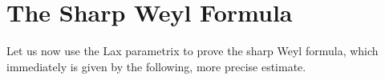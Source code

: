 \begin{comment}
    We have
    \[ \frac{\partial^N K_t(x,y)}{\partial t^N} = (2 \pi i)^N \int (\phi_1(x,y,\xi) - \phi_0(x,y,\xi))^N a(x,y,\xi) e^{2 \pi i \phi_t(x,y,\xi)}\; d\xi. \]
    Now $(\phi_1 - \phi_0)^N \cdot a$ is a symbol of order $r + N$. But on the other hand, using the fact that $(\phi_1 - \phi_0)^N \lesssim |x - y|^{2N} |\xi|^N$, and thus vanishes to order $2N$ on the diagonal, then combined with the fact that $|\nabla_\xi \phi(x,y,\xi)| \gtrsim |x - y|$, we actually see via an integration by parts $2N$ times in $\xi$ that we can rewrite the integral in terms of a symbol of order $r - N$ and the same phase $\phi_t$. Applying Taylor's theorem, we write
    \[ K(x,y) = K_1(x,y) = \sum_{k = 0}^{N-1} \frac{1}{k!} \left. \frac{\partial^k K_t(x,y)}{\partial t^k} \right|_{t = 1} + \frac{1}{N!} \int_0^1 t^{N-1} \frac{d^NK_t(x,y)}{dt^N}\; dt. \]
    This integral gives an arbitrarily smooth kernel as $N \to \infty$. Thus if we let $T$ be a pseudodifferential operator of order $r$ such that
    \[ T \sim \sum_{k = 0}^\infty \frac{1}{k!} \left. \frac{\partial^k K_t(x,y)}{\partial t^k} \right|_{t = 1}, \]
    then $T - S$ is a smoothing operator. Now if $\tilde{T}$ is the pseudodifferential operator corresponding to the symbol $a(x,x,\xi)$, then $T - \tilde{T}$, and thus $S - \tilde{T}$, is a pseudodifferential operator of order $r-1$. The converse is similar, working in the opposite direction, i.e. from $t = 1$ to $t = 0$, and is left as an exercise.
\end{proof}
\end{comment}

%
%

\section{The Sharp Weyl Formula}

Let us now use the Lax parametrix to prove the sharp Weyl formula, which immediately is given by the following, more precise estimate.


